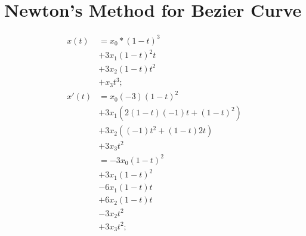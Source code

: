 \documentclass{article}
\begin{document}
\section{Newton's Method for Bezier Curve}
\begin{align}
  x(t) &= x_0*(1 - t)^3 \\ 
       &+ 3x_1(1 - t)^2t \\
       &+ 3x_2(1 - t)t^2 \\
       &+ x_3t^3; \\
  x'(t) &= x_0(-3)(1 - t)^2 \\ 
        &+ 3x_1\left(2(1 - t)(-1)t + (1 - t)^2\right) \\
        &+ 3x_2\left((-1)t^2 + (1 - t)2t\right) \\
        &+ 3x_3t^2 \\
        &= -3x_0(1 - t)^2 \\ 
        &+ 3x_1(1 - t)^2 \\
        &- 6x_1(1 - t)t \\
        &+ 6x_2(1 - t)t \\
        &- 3x_2t^2 \\
        &+ 3x_3t^2;
\end{align}
\end{document}
